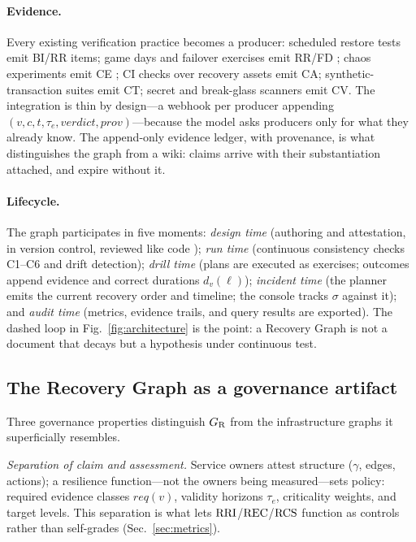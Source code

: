 \paragraph{Evidence.} Every existing verification practice becomes a producer: scheduled restore tests emit BI/RR items; game days and failover exercises emit RR/FD \citep{krishnan2012weathering}; chaos experiments emit CE \citep{basiri2016chaos,litmuschaos}; CI checks over recovery assets emit CA; synthetic-transaction suites emit CT; secret and break-glass scanners emit CV. The integration is thin by design---a webhook per producer appending $(v, c, t, \tau_e, \mathit{verdict}, \mathit{prov})$---because the model asks producers only for what they already know. The append-only evidence ledger, with provenance, is what distinguishes the graph from a wiki: claims arrive with their substantiation attached, and expire without it.

\paragraph{Lifecycle.} The graph participates in five moments: \emph{design time} (authoring and attestation, in version control, reviewed like code \citep{morris2020iac}); \emph{run time} (continuous consistency checks C1--C6 and drift detection); \emph{drill time} (plans are executed as exercises; outcomes append evidence and correct durations $d_v(\ell)$); \emph{incident time} (the planner emits the current recovery order and timeline; the console tracks $\sigma$ against it); and \emph{audit time} (metrics, evidence trails, and query results are exported). The dashed loop in Fig.~\ref{fig:architecture} is the point: a Recovery Graph is not a document that decays but a hypothesis under continuous test.

\subsection{The Recovery Graph as a governance artifact}
\label{sec:governance}

Three governance properties distinguish $G_{\mathrm{R}}$ from the infrastructure graphs it superficially resembles.

\emph{Separation of claim and assessment.} Service owners attest structure ($\gamma$, edges, actions); a resilience function---not the owners being measured---sets policy: required evidence classes $\mathit{req}(v)$, validity horizons $\tau_e$, criticality weights, and target levels. This separation is what lets $\mathrm{RRI}$/$\mathrm{REC}$/$\mathrm{RCS}$ function as controls rather than self-grades (Sec.~\ref{sec:metrics}).

